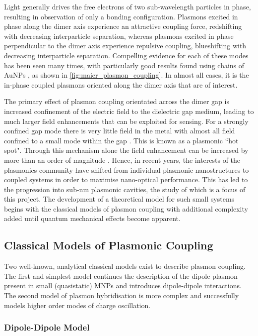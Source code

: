 \documentclass{article}
\begin{document}
Light generally drives the free electrons of two sub-wavelength particles in phase, resulting in observation of only a bonding configuration. Plasmons excited in phase along the dimer axis experience an attractive coupling force, redshifting with decreasing interparticle separation, whereas plasmons excited in phase perpendicular to the dimer axis experience repulsive coupling, blueshifting with decreasing interparticle separation. Compelling evidence for each of these modes has been seen many times, with particularly good results found using chains of AuNPs \cite{maier2002}, as shown in \autoref{fig:maier_plasmon_coupling}. In almost all cases, it is the in-phase coupled plasmons oriented along the dimer axis that are of interest.

The primary effect of plasmon coupling orientated across the dimer gap is increased confinement of the electric field to the dielectric gap medium, leading to much larger field enhancements that can be exploited for sensing. For a strongly confined gap mode there is very little field in the metal with almost all field confined to a small mode within the gap \cite{romero2006}. This is known as a plasmonic ``hot spot". Through this mechanism alone the field enhancement can be increased by more than an order of magnitude \cite{hao2004, talley2005}. Hence, in recent years, the interests of the plasmonics community have shifted from individual plasmonic nanostructures to coupled systems in order to maximise nano-optical performance. This has led to the progression into sub-nm plasmonic cavities, the study of which is a focus of this project. The development of a theoretical model for such small systems begins with the classical models of plasmon coupling with additional complexity added until quantum mechanical effects become apparent.

\subsection{Classical Models of Plasmonic Coupling}

Two well-known, analytical classical models exist to describe plasmon coupling. The first and simplest model continues the description of the dipole plasmon present in small (quasistatic) MNPs and introduces dipole-dipole interactions. The second model of plasmon hybridisation is more complex and successfully models higher order modes of charge oscillation.

\subsubsection{Dipole-Dipole Model}
\end{document}
